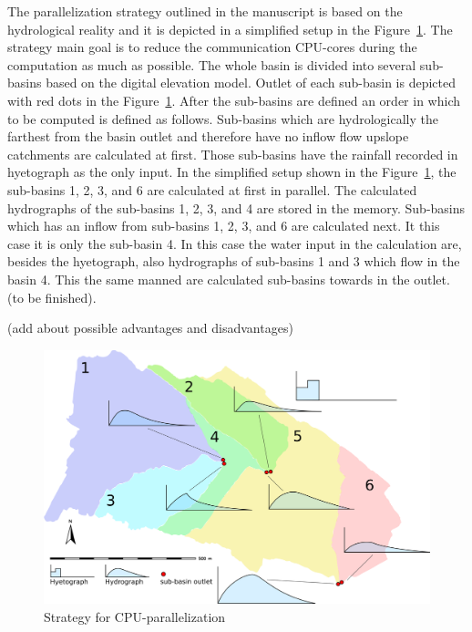 The parallelization strategy outlined in the manuscript is based on
the hydrological reality and it is depicted in a simplified setup in
the Figure~\ref{fig:cpu-parallel}. The strategy main goal is to reduce
the communication CPU-cores during the computation as much as
possible. The whole basin is divided into several sub-basins based on
the digital elevation model. Outlet of each sub-basin is depicted with
red dots in the Figure~\ref{fig:cpu-parallel}. After the sub-basins
are defined an order in which to be computed is defined as
follows. Sub-basins which are hydrologically the farthest from the
basin outlet and therefore have no inflow flow upslope catchments are
calculated at first. Those sub-basins have the rainfall recorded in
hyetograph as the only input. In the simplified setup shown in the
Figure~\ref{fig:cpu-parallel}, the sub-basins 1, 2, 3, and 6 are
calculated at first in parallel. The calculated hydrographs of the
sub-basins 1, 2, 3, and 4 are stored in the memory. Sub-basins which
has an inflow from sub-basins 1, 2, 3, and 6 are calculated next. It
this case it is only the sub-basin 4. In this case the water input in
the calculation are, besides the hyetograph, also hydrographs of
sub-basins 1 and 3 which flow in the basin 4. This the same manned are
calculated sub-basins towards in the outlet. (to be finished).

(add about possible advantages and disadvantages)

\begin{figure}[ht!]
  \begin{center}
    \includegraphics[width=1.0\columnwidth]{figures/smoderp-cpu-parallel.png}
    \caption{Strategy for CPU-parallelization}
    \label{fig:cpu-parallel}
  \end{center}
\end{figure}




